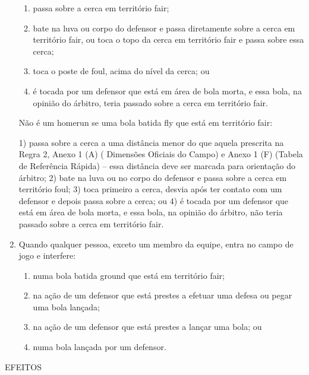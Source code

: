 \begin{enumerate}[label=(\alph*)]
	\begin{enumerate}[label=\roman*.]
		\item passa sobre a cerca em território \gls{fair};
		\item bate na luva ou corpo do defensor e passa diretamente sobre a cerca em território \gls{fair}, ou toca o topo da cerca em território \gls{fair} e passa sobre essa cerca;
		\item  toca o poste de \gls{foul}, acima do nível da cerca; ou
		\item  é tocada por um defensor que está em área de bola morta, e essa bola, na opinião do árbitro, teria passado sobre a cerca em território \gls{fair}.
	\end{enumerate}
	Não é um \gls{homerun} se uma bola batida \gls{fly} que está em território \gls{fair}:

	1) passa sobre a cerca a uma distância menor do que aquela prescrita na Regra 2, Anexo 1 (A) ( Dimensões Oficiais do Campo) e Anexo 1 (F) (Tabela de Referência Rápida) -- essa distância deve ser marcada para orientação do árbitro;
	2) bate na luva ou no corpo do defensor e passa sobre a cerca em território \gls{foul};
	3) toca primeiro a cerca, desvia após ter contato com um defensor e depois passa sobre a cerca; ou
	4) é tocada por um defensor que está em área de bola morta, e essa bola, na opinião do árbitro, não teria passado sobre a cerca em território \gls{fair}.

	\item   Quando qualquer pessoa, exceto um membro da equipe, entra no campo de jogo e interfere:

	\begin{enumerate}[label=\roman*.]
		\item  numa bola batida \gls{ground} que está em território \gls{fair};
		\item  na ação de um defensor que está prestes a efetuar uma defesa ou pegar uma bola lançada;
		\item na ação de um defensor que está prestes a lançar uma bola; ou
		\item numa bola lançada por um defensor.
	\end{enumerate}
\end{enumerate}

EFEITOS

